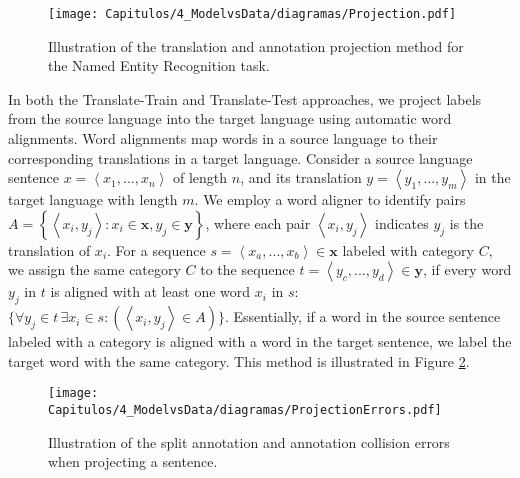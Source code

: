 \begin{figure}[htb]
    \centering
    \texttt{[image: Capitulos/4\_ModelvsData/diagramas/Projection.pdf]}
    \caption{Illustration of the translation and annotation projection method for the Named Entity Recognition task.}
    \label{fig:annotation_projection}
\end{figure}


In both the Translate-Train and Translate-Test approaches, we project labels from the source language into the target language using automatic word alignments. Word alignments map words in a source language to their corresponding translations in a target language. Consider a source language sentence $x=\left\langle x_1,...,x_n  \right\rangle$ of length $n$, and its translation $y=\left\langle y_1,...,y_m \right\rangle$ in the target language with length $m$. We employ a word aligner to identify pairs $A=\left\{\left\langle x_{i}, y_{j}\right\rangle: x_{i} \in \mathbf{x}, y_{j} \in \mathbf{y}\right\}$, where each pair $\left\langle x_i,y_j\right\rangle$ indicates $y_j$ is the translation of $x_i$. For a sequence $s =\left\langle x_a,...,x_b  \right\rangle \in \mathbf{x}$ labeled with category $C$, we assign the same category $C$ to the sequence $t =\left\langle y_c,...,y_d  \right\rangle \in \mathbf{y}$, if every word $y_j$ in $t$ is aligned with at least one word $x_i$ in $s$: $\{ \forall y_j \in t \, \exists x_i \in  s : ( \left\langle x_i,y_j \right\rangle \in A )\}$. Essentially, if a word in the source sentence labeled with a category is aligned with a word in the target sentence, we label the target word with the same category. This method is illustrated in Figure \ref{fig:projection_errors}.


\begin{figure}
    \centering
    \texttt{[image: Capitulos/4\_ModelvsData/diagramas/ProjectionErrors.pdf]}
    \caption{Illustration of the split annotation and annotation collision errors when projecting a sentence.}
    \label{fig:projection_errors}
\end{figure}

